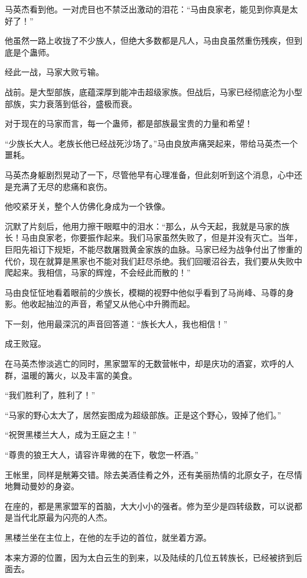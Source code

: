 \begin{this_body}
马英杰看到他。一对虎目也不禁泛出激动的泪花：“马由良家老，能见到你真是太好了！”

他虽然一路上收拢了不少族人，但绝大多数都是凡人，马由良虽然重伤残疾，但到底是个蛊师。

经此一战，马家大败亏输。

战前。是大型部族，底蕴深厚到能冲击超级家族。但战后，马家已经彻底沦为小型部族，实力衰落到低谷，盛极而衰。

对于现在的马家而言，每一个蛊师，都是部族最宝贵的力量和希望！

“少族长大人。老族长他已经战死沙场了。”马由良放声痛哭起来，带给马英杰一个噩耗。

马英杰身躯剧烈晃动了一下，尽管他早有心理准备，但此刻听到这个消息，心中还是充满了无尽的悲痛和哀伤。

他咬紧牙关，整个人仿佛化身成为一个铁像。

沉默了片刻后，他用力擦干眼眶中的泪水：“那么，从今天起，我就是马家的族长！马由良家老，你要振作起来。我们马家虽然失败了，但是并没有灭亡。当年，巨阳先祖订下规矩，不能尽数屠戮黄金家族的血脉。马家已经为战争付出了惨重的代价，现在就算是黑家也不能对我们赶尽杀绝。我们回暖沼谷去，我们要从失败中爬起来。我相信，马家的辉煌，不会经此而散的！”

马由良怔怔地看着眼前的少族长，模糊的视野中他似乎看到了马尚峰、马尊的身影。他收起抽泣的声音，希望又从他心中升腾而起。

下一刻，他用最深沉的声音回答道：“族长大人，我也相信！”

成王败寇。

在马英杰惨淡逃亡的同时，黑家盟军的无数营帐中，却是庆功的酒宴，欢呼的人群，温暖的篝火，以及丰富的美食。

“我们胜利了，胜利了！”

“马家的野心太大了，居然妄图成为超级部族。正是这个野心，毁掉了他们。”

“祝贺黑楼兰大人，成为王庭之主！”

“尊贵的狼王大人，请容许卑微的在下，敬您一杯酒。”

王帐里，同样是觥筹交错。除去美酒佳肴之外，还有美丽热情的北原女子，在尽情地舞动曼妙的身姿。

在座的，都是黑家盟军的首脑，大大小小的强者。修为至少是四转级数，可以说都是当代北原最为闪亮的人杰。

黑楼兰坐在主位上，在他的左手边的首位，就坐着方源。

本来方源的位置，因为太白云生的到来，以及陆续的几位五转族长，已经被挤到后面去。


\end{this_body}
